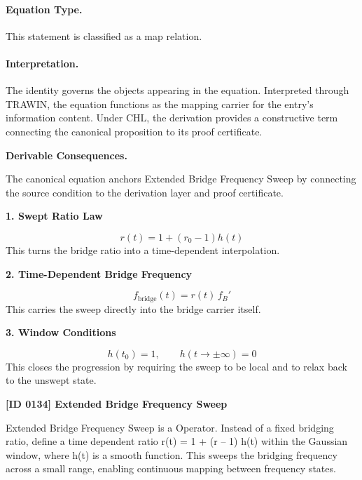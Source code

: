 \paragraph{Equation Type.}
This statement is classified as a map relation.

\paragraph{Interpretation.}
The identity governs the objects appearing in the equation. Interpreted through TRAWIN, the equation functions as the mapping carrier for the entry’s information content. Under CHL, the derivation provides a constructive term connecting the canonical proposition to its proof certificate.

\par\vspace{0.35em}
\noindent\textbf{Derivable Consequences.}\quad
\begingroup
\footnotesize
\raggedright
The canonical equation anchors Extended Bridge Frequency Sweep by connecting the source condition to the derivation layer and proof certificate.
\par\endgroup

\noindent\textbf{1. Swept Ratio Law}\par
\[
r(t)=1+(r_0-1)h(t)
\]
\noindent This turns the bridge ratio into a time-dependent interpolation.\par
\noindent\textbf{2. Time-Dependent Bridge Frequency}\par
\[
f_{\mathrm{bridge}}(t)=r(t)\,f_B'
\]
\noindent This carries the sweep directly into the bridge carrier itself.\par
\noindent\textbf{3. Window Conditions}\par
\[
h(t_0)=1,\qquad h(t\to\pm\infty)=0
\]
\noindent This closes the progression by requiring the sweep to be local and to relax back to the unswept state.\par

\clearpage
\noindent\textbf{[ID 0134] Extended Bridge Frequency Sweep}\par
\vspace{0.35em}
\begingroup\small
{}
Extended Bridge Frequency Sweep is a Operator. Instead of a fixed bridging ratio, define a time dependent ratio r(t) = 1 + (r  -- 1) h(t) within the Gaussian window, where h(t) is a smooth function. This sweeps the bridging frequency across a small range, enabling continuous mapping between frequency states.

